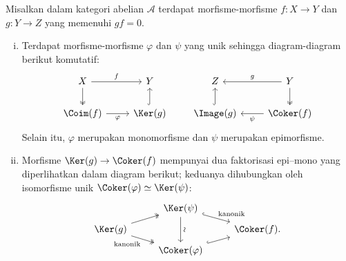 \begin{lema}\label{prop:image-to-kernel}
	Misalkan dalam kategori abelian $\mathcal{A}$ terdapat morfisme-morfisme
	$f: X \to Y$ dan $g: Y \to Z$ yang memenuhi $gf = 0$.
	\begin{enumerate}[(i)]
		\item Terdapat morfisme-morfisme $\varphi$ dan $\psi$ yang unik sehingga
		diagram-diagram berikut komutatif:
		\begin{equation}\label{eqn:cplx-transition}
		\begin{tikzcd}
			X \arrow[r, "f"] \arrow[twoheadrightarrow, d] & Y \\
			\Coim(f) \arrow[r, "\varphi"'] & \Ker(g) \arrow[hookrightarrow, u]
		\end{tikzcd} \qquad
		\begin{tikzcd}
			Z & Y \arrow[twoheadrightarrow, d] \arrow[l, "g"'] \\
			\Image(g) \arrow[hookrightarrow, u] & \Coker(f) \arrow[l, "\psi"]
		\end{tikzcd}
		\end{equation}
		Selain itu, $\varphi$ merupakan monomorfisme dan $\psi$ merupakan
		epimorfisme.

		\item Morfisme $\Ker(g) \to \Coker(f)$ mempunyai dua faktorisasi
		epi--mono yang diperlihatkan dalam diagram berikut; keduanya dihubungkan
		oleh isomorfisme unik $\Coker(\varphi) \simeq \Ker(\psi)$:
		\[\begin{tikzcd}[row sep=tiny]
			& \Ker(\psi) \arrow[hookrightarrow, rd, "\text{kanonik}"] \arrow[dd, "\sim" sloped] & \\
			\Ker(g) \arrow[twoheadrightarrow, ru] \arrow[twoheadrightarrow, rd, "\text{kanonik}"'] & & \Coker(f) . \\
			& \Coker(\varphi) \arrow[hookrightarrow, ru] &
		\end{tikzcd}\]
	\end{enumerate}
\end{lema}

